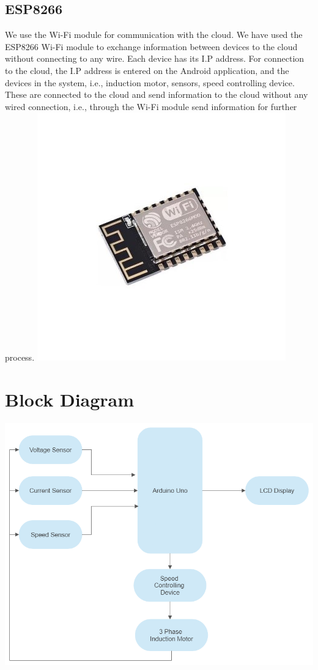 \subsection{ESP8266}
We use the Wi-Fi module for communication with the cloud. We have used the ESP8266 Wi-Fi module to exchange information between devices to the cloud without connecting to any wire. Each device has its I.P address. For connection to the cloud,  the I.P address is entered on the Android application, and the devices in the system, i.e., induction motor, sensors, speed controlling device. 
These are connected to the cloud and send information to the cloud without any wired connection, i.e., through the Wi-Fi module send information for further process.
{\includegraphics[height=0.2\textheight]{Figures/esp.jpg}}

\section{Block Diagram}
{\includegraphics[height=0.5\textheight]{Figures/Drawing.jpg}}

